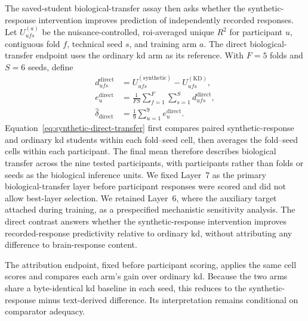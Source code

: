 The saved-student biological-transfer assay then asks whether the synthetic-response intervention improves prediction of independently recorded responses.
Let \(U_{ufs}^{(a)}\) be the nuisance-controlled, \ac{roi}-averaged unique \(R^2\) for participant \(u\), contiguous fold \(f\), technical seed \(s\), and training arm \(a\).
The direct biological-transfer endpoint uses the ordinary \ac{kd} arm as its reference.
With \(F=5\) folds and \(S=6\) seeds, define
\begin{equation}
\begin{aligned}
d_{ufs}^{\mathrm{direct}}
&=
U_{ufs}^{(\mathrm{synthetic})}
-
U_{ufs}^{(\mathrm{KD})},
\\
e_u^{\mathrm{direct}}
&=
\frac{1}{FS}
\sum_{f=1}^{F}
\sum_{s=1}^{S}
d_{ufs}^{\mathrm{direct}},
\\
\widehat{\delta}_{\mathrm{direct}}
&=
\frac{1}{9}
\sum_{u=1}^{9}
e_u^{\mathrm{direct}}.
\end{aligned}
\label{eq:synthetic-direct-transfer}
\end{equation}
Equation~\ref{eq:synthetic-direct-transfer} first compares paired synthetic-response and ordinary \ac{kd} students within each fold--seed cell, then averages the fold--seed cells within each participant.
The final mean therefore describes biological transfer across the nine tested participants, with participants rather than folds or seeds as the biological inference units.
We fixed Layer~7 as the primary biological-transfer layer before participant responses were scored and did not allow best-layer selection.
We retained Layer~6, where the auxiliary target attached during training, as a prespecified mechanistic sensitivity analysis.
The direct contrast answers whether the synthetic-response intervention improves recorded-response predictivity relative to ordinary \ac{kd}, without attributing any difference to brain-response content.

The attribution endpoint, fixed before participant scoring, applies the same cell scores and compares each arm's gain over ordinary \ac{kd}.
Because the two arms share a byte-identical \ac{kd} baseline in each seed, this reduces to the synthetic-response minus text-derived difference.
Its interpretation remains conditional on comparator adequacy.

